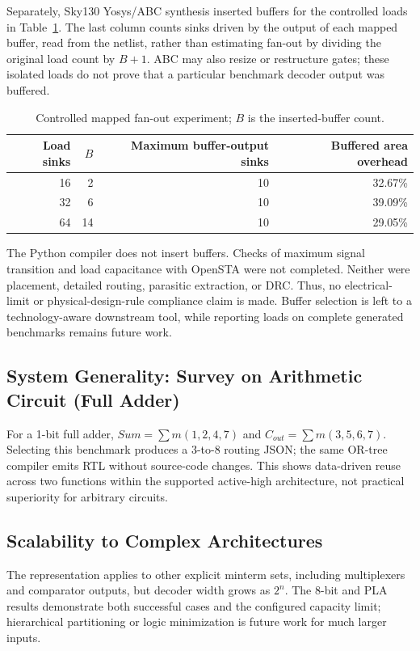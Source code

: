 \documentclass[runningheads]{llncs}
\begin{document}
Separately, Sky130 Yosys/ABC synthesis inserted buffers for the controlled loads in Table~\ref{tab:fanout}. The last column counts sinks driven by the output of each mapped buffer, read from the netlist, rather than estimating fan-out by dividing the original load count by $B+1$. ABC may also resize or restructure gates; these isolated loads do not prove that a particular benchmark decoder output was buffered.

\begin{table}[t]
\caption{Controlled mapped fan-out experiment; $B$ is the inserted-buffer count.}
\label{tab:fanout}
\centering\small
\begin{tabular}{rrrr}
\toprule
Load sinks & $B$ & Maximum buffer-output sinks & Buffered area overhead \\
\midrule
16 & 2 & 10 & 32.67\% \\
32 & 6 & 10 & 39.09\% \\
64 & 14 & 10 & 29.05\% \\
\bottomrule
\end{tabular}
\end{table}

The Python compiler does not insert buffers. Checks of maximum signal transition and load capacitance with OpenSTA were not completed. Neither were placement, detailed routing, parasitic extraction, or DRC. Thus, no electrical-limit or physical-design-rule compliance claim is made. Buffer selection is left to a technology-aware downstream tool, while reporting loads on complete generated benchmarks remains future work.

\subsection{System Generality: Survey on Arithmetic Circuit (Full Adder)}
For a 1-bit full adder, $Sum=\sum m(1,2,4,7)$ and $C_{out}=\sum m(3,5,6,7)$. Selecting this benchmark produces a 3-to-8 routing JSON; the same OR-tree compiler emits RTL without source-code changes. This shows data-driven reuse across two functions within the supported active-high architecture, not practical superiority for arbitrary circuits.

\subsection{Scalability to Complex Architectures}
The representation applies to other explicit minterm sets, including multiplexers and comparator outputs, but decoder width grows as $2^n$. The 8-bit and PLA results demonstrate both successful cases and the configured capacity limit; hierarchical partitioning or logic minimization is future work for much larger inputs.
\end{document}
